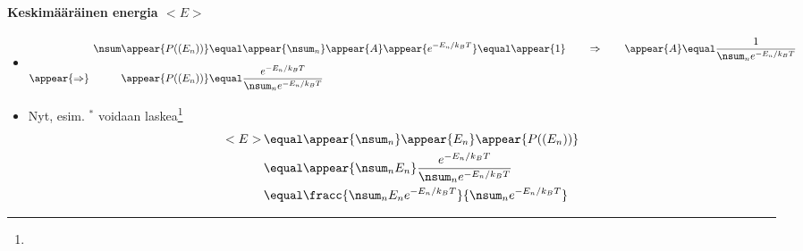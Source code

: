\begin{frame}%
\frametitle{\texorpdfstring{\culine[\sectiontitleulinecolor]{\sectiontitle}}{\sectiontitle} }
\framesubtitle{Keskimääräinen energia $< E >$}
\begin{itemize}
\item[] \[
\begin{aligned}
\nsum \appear{P \textrm{((} E_{n} \textrm{))}} &  \equal  \appear{\nsum_{n}} \appear{A} \appear{e^{-E_{n} / k_{B} T} } \equal  \appear{1} \qquad \Rightarrow \qquad \appear{A}  \equal \frac{1}{\nsum_{n} e^{-E_{n} / k_{B} T}} \\
 \appear{\Rightarrow} \qquad \quad \appear{P \textrm{((} E_{n} \textrm{))}} & \equal \frac{e^{-E_{n} / k_{B} T}}{\nsum_{n} e^{-E_{n} / k_{B} T}}
\end{aligned}
\]
\item Nyt, esim. $^*$ voidaan laskea\footnote{{ }}
\[
\begin{aligned}
 < E >\, &  \equal \appear{\nsum_{n}} \appear{E_{n}} \appear{P \textrm{((} E_{n} \textrm{))}} \\
 & \equal \appear{\nsum_{n} E_{n}} \frac{e^{-E_{n} / k_{B} T}}{\nsum_{n} e^{-E_{n} / k_{B} T}} \\
 & \equal \fracc{\nsum_{n} E_{n} e^{-E_{n} / k_{B} T}}{\nsum_{n} e^{-E_{n} / k_{B} T}}
\end{aligned}
\]
\end{itemize}


\endofslide 
\end{frame}

